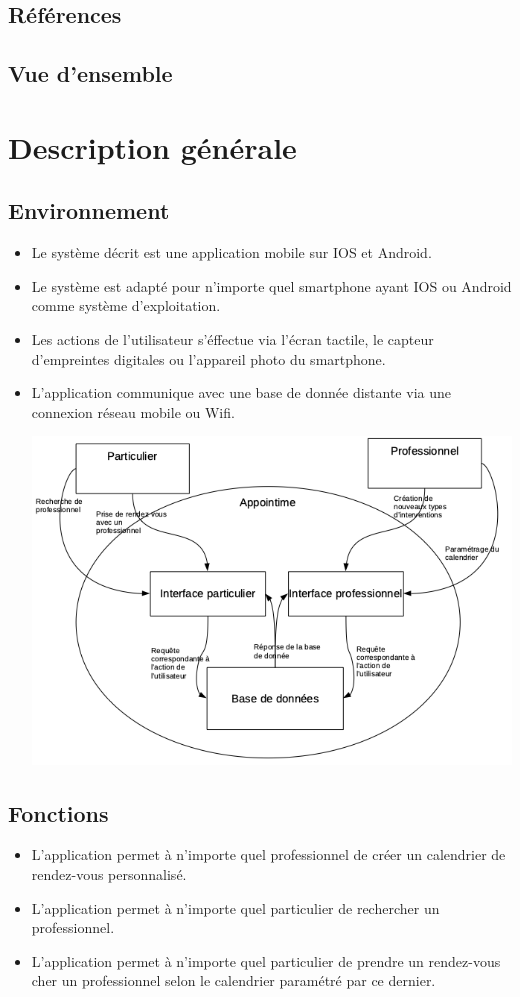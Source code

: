 \documentclass{article}
\begin{document}
\subsection{Références}

\subsection{Vue d'ensemble}


\section{Description générale}
\subsection{Environnement}
\begin{itemize}
\item Le système décrit est une application mobile sur IOS et
Android.
\item Le système est adapté pour n'importe quel smartphone ayant IOS ou Android comme
système d'exploitation.
\item Les actions de l'utilisateur s'éffectue via l'écran
  tactile, le capteur d'empreintes digitales ou l'appareil photo du smartphone.
\item L'application communique avec une base de donnée distante
  via une connexion \og réseau mobile\fg{} ou Wifi.


\includegraphics[scale=0.5]{ShematDiagrammes/ShematGeneral.png}
\end{itemize}
\subsection{Fonctions}
\begin{itemize}
\item L'application permet à n'importe quel professionnel de créer un
calendrier de rendez-vous personnalisé.
\item L'application permet à n'importe quel particulier de rechercher
  un professionnel.
\item L'application permet à n'importe quel particulier de prendre un
  rendez-vous cher un professionnel selon le calendrier paramétré par
  ce dernier.
\end{itemize}
\end{document}
